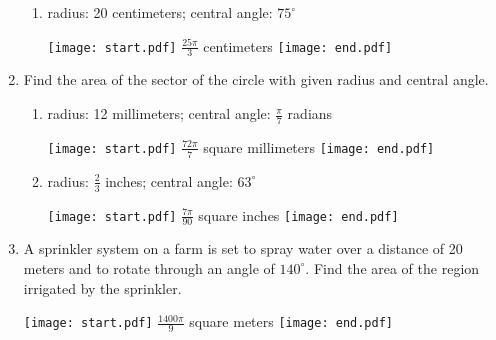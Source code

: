 \documentclass[12pt]{article}
\begin{document}
\begin{enumerate}
\begin{enumerate}
\item radius: 20 centimeters; central angle: $75^{\circ}$

\texttt{[image: start.pdf]}
{$\displaystyle \frac{25\pi}{3}$ centimeters}
\texttt{[image: end.pdf]}


\end{enumerate}

\newpage

\item Find the area of the sector of the circle with given radius and central angle.

\begin{enumerate}

\item radius: 12 millimeters; central angle: $\displaystyle \frac{\pi}{7}$ radians

\texttt{[image: start.pdf]}
{$\displaystyle \frac{72\pi}{7}$ square millimeters}
\texttt{[image: end.pdf]}


\item radius: $\displaystyle \frac{2}{3}$ inches; central angle: $63^{\circ}$

\texttt{[image: start.pdf]}
{$\displaystyle \frac{7\pi}{90}$ square inches}
\texttt{[image: end.pdf]}


\end{enumerate}

\item A sprinkler system on a farm is set to spray water over a distance of 20 meters and to rotate through an angle of $140^{\circ}$.  Find the area of the region irrigated by the sprinkler.

\texttt{[image: start.pdf]}
{$\displaystyle \frac{1400\pi}{9}$ square meters}
\texttt{[image: end.pdf]}



\end{enumerate}
\end{document}
